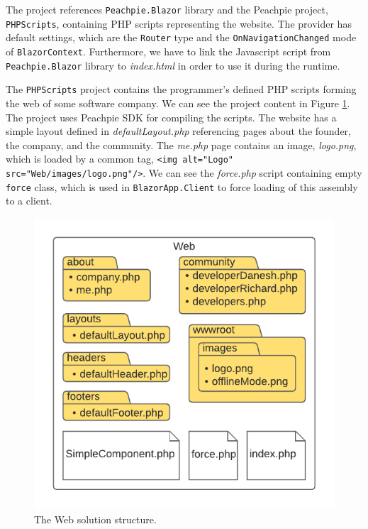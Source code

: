 \par
The project references \texttt{Peachpie.Blazor} library and the Peachpie project, \texttt{PHPScripts}, containing PHP scripts representing the website.
The provider has default settings, which are the \texttt{Router} type and the \texttt{OnNavigationChanged} mode of \texttt{BlazorContext}.
Furthermore, we have to link the Javascript script from \texttt{Peachpie.Blazor} library to \textit{index.html} in order to use it during the runtime.
\par
The \texttt{PHPScripts} project contains the programmer's defined PHP scripts forming the web of some software company.
We can see the project content in Figure \ref{img22:web}.
The project uses Peachpie \ac{SDK} for compiling the scripts.
The website has a simple layout defined in \textit{defaultLayout.php} referencing pages about the founder, the company, and the community.
The \textit{me.php} page contains an image, \textit{logo.png}, which is loaded by a common tag, \texttt{<img alt="Logo" src="Web/images/logo.png"/>}.
We can see the \textit{force.php} script containing empty \texttt{force} class, which is used in \texttt{BlazorApp.Client} to force loading of this assembly to a client.
\par
\begin{figure}\centering
\includegraphics[scale=0.9]{./img/WebStructure}
\caption{The Web solution structure.}
\label{img22:web}
\end{figure} 
